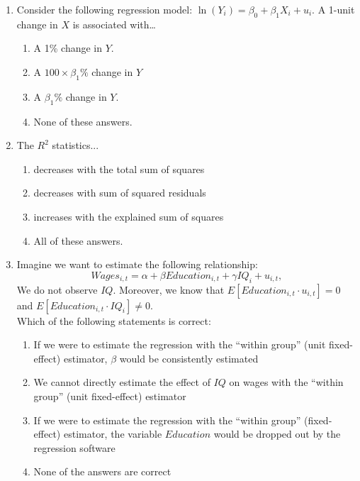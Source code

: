 \documentclass{article}
\begin{document}
\parindent

\begin{enumerate}

    \item Consider the following regression model: $\ln(Y_i) = \beta_0 + \beta_1 X_i + u_i$. A 1-unit change in $X$ is associated with…
    \begin{enumerate}[label=\alph*)]
        \item A 1\% change in $Y$.
        \item A $100 \times \beta_1 \%$ change in $Y$
        \item A $\beta_1 \%$ change in $Y$. %
        \item None of these answers.
    \end{enumerate}\vspace{.25cm}

    \item The $R^2$ statistics...
    \begin{enumerate}[label=\alph*)]
        \item decreases with the total sum of squares
        \item decreases with sum of squared residuals
        \item increases with the explained sum of squares
        \item All of these answers.
    \end{enumerate}\vspace{.25cm}

   \item Imagine we want to estimate the following relationship:
\[
Wages_{i,t}=\alpha+\beta Education_{i,t}+ \gamma IQ_i+u_{i,t}, 
\]
We do not observe $IQ$. Moreover, we know that $E[Education_{i,t} \cdot u_{i,t}]=0$ and  $E[Education_{i,t} \cdot IQ_i]\neq 0$.\\ Which of the following statements is correct:
\begin{enumerate}[label=(\alph*)]
    \item If we were to estimate the regression with the ``within group'' (unit fixed-effect) estimator, $\beta$ would be consistently estimated
    \item We cannot directly estimate the effect of $IQ$ on wages with the ``within group'' (unit fixed-effect) estimator 
    \item If we were to estimate the regression with the ``within group'' (fixed-effect) estimator, the variable $Education$ would be dropped out by the regression software
    \item None of the answers are correct
\end{enumerate}\vspace{.25cm}


\end{enumerate}
\end{document}
